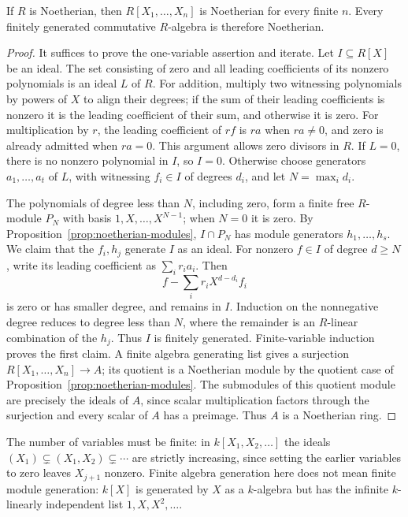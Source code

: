 \begin{theorem}\label{thm:hilbert-basis}
If $R$ is Noetherian, then $R[X_1,\ldots,X_n]$ is Noetherian for every
finite $n$. Every finitely generated commutative $R$-algebra is therefore
Noetherian.
\end{theorem}
\begin{proof}
It suffices to prove the one-variable assertion and iterate.
Let $I\subseteq R[X]$ be an ideal. The set consisting of zero and all
leading coefficients of its nonzero polynomials is an ideal $L$ of $R$.
For addition, multiply two witnessing polynomials by powers of $X$ to
align their degrees; if the sum of their leading coefficients is nonzero
it is the leading coefficient of their sum, and otherwise it is zero.
For multiplication by $r$, the leading coefficient of $rf$ is $ra$
when $ra\ne0$, and zero is already admitted when $ra=0$.
This argument allows zero divisors in $R$.
If $L=0$, there is no nonzero polynomial in $I$, so $I=0$.
Otherwise choose generators $a_1,\ldots,a_t$ of $L$, with witnessing
$f_i\in I$ of degrees $d_i$, and let $N=\max_i d_i$.

The polynomials of degree less than $N$, including zero, form a finite
free $R$-module $P_N$ with basis $1,X,\ldots,X^{N-1}$; when $N=0$ it
is zero. By Proposition~\ref{prop:noetherian-modules},
$I\cap P_N$ has module generators $h_1,\ldots,h_s$.
We claim that the $f_i,h_j$ generate $I$ as an ideal. For nonzero
$f\in I$ of degree $d\ge N$, write its leading coefficient as
$\sum_i r_ia_i$. Then
\[
 f-\sum_i r_iX^{d-d_i}f_i
\]
is zero or has smaller degree, and remains in $I$.
Induction on the nonnegative degree reduces to degree less than $N$,
where the remainder is an $R$-linear combination of the $h_j$.
Thus $I$ is finitely generated. Finite-variable induction proves the
first claim. A finite algebra generating list gives a surjection
$R[X_1,\ldots,X_n]\to A$; its quotient is a Noetherian module by the
quotient case of Proposition~\ref{prop:noetherian-modules}.
The submodules of this quotient module are precisely the ideals of
$A$, since scalar multiplication factors through the surjection and
every scalar of $A$ has a preimage. Thus $A$ is a Noetherian ring.
\end{proof}
The number of variables must be finite: in $k[X_1,X_2,\ldots]$ the ideals
$(X_1)\subsetneq(X_1,X_2)\subsetneq\cdots$ are strictly increasing,
since setting the earlier variables to zero leaves $X_{j+1}$ nonzero.
Finite algebra generation here does not mean finite module generation:
$k[X]$ is generated by $X$ as a $k$-algebra but has the infinite
$k$-linearly independent list $1,X,X^2,\ldots$.

